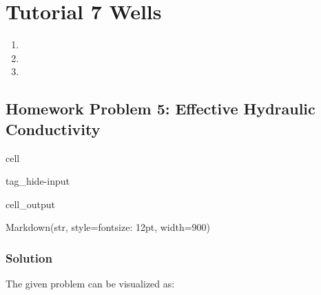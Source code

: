\documentclass[letterpaper,10pt,english]{jupyterBook}
\begin{document}
\chapter{Tutorial 7 \sphinxhyphen{} Wells}
\label{\detokenize{content/tutorials/T7/tutorial_07:tutorial-7-wells}}\label{\detokenize{content/tutorials/T7/tutorial_07::doc}}

\begin{enumerate}
%
\item {} 
\sphinxAtStartPar
{}


\item {} 
\sphinxAtStartPar
{}


\item {} 
\sphinxAtStartPar
{}

\end{enumerate}




\section{Homework Problem 5: Effective Hydraulic Conductivity}
\label{\detokenize{content/tutorials/T7/tutorial_07:homework-problem-5-effective-hydraulic-conductivity}}
\begin{sphinxuseclass}{cell}
\begin{sphinxuseclass}{tag_hide-input}\begin{sphinxVerbatimOutput}

\begin{sphinxuseclass}{cell_output}
\begin{sphinxVerbatim}[commandchars=\\\{\}]
Markdown(str, style=\PYGZob{}\PYGZsq{}font\PYGZhy{}size\PYGZsq{}: \PYGZsq{}12pt\PYGZsq{}\PYGZcb{}, width=900)
\end{sphinxVerbatim}

\end{sphinxuseclass}\end{sphinxVerbatimOutput}

\end{sphinxuseclass}
\end{sphinxuseclass}

\subsection{Solution}
\label{\detokenize{content/tutorials/T7/tutorial_07:solution}}
\sphinxAtStartPar
The given problem can be visualized as:
\end{document}
